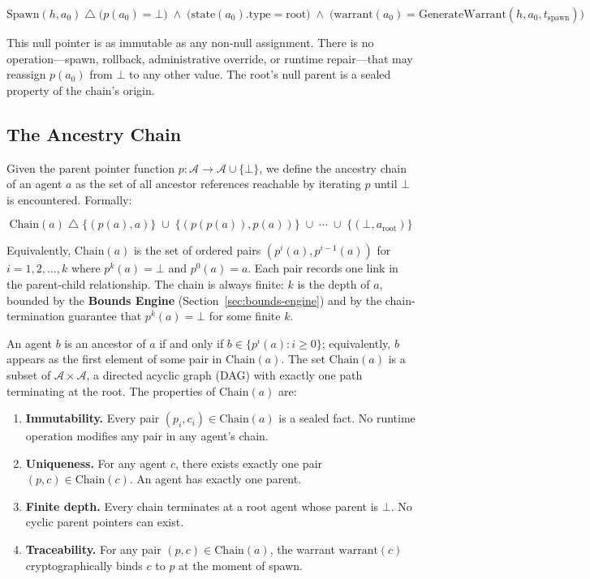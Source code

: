 \begin{equation}
\text{Spawn}(h, a_0) \;\triangle\; \bigl( p(a_0) = \bot \bigr) \;\land\; \bigl( \text{state}(a_0).\text{type} = \text{root} \bigr) \;\land\; \bigl( \text{warrant}(a_0) = \text{GenerateWarrant}(h, a_0, t_{\text{spawn}}) \bigr)
\end{equation}

This null pointer is as immutable as any non-null assignment. There is no operation—spawn, rollback, administrative override, or runtime repair—that may reassign $p(a_0)$ from $\bot$ to any other value. The root's null parent is a sealed property of the chain's origin.

\subsection{The Ancestry Chain}\label{sec:ancestry-chain}

Given the parent pointer function $p : \mathcal{A} \to \mathcal{A} \cup \{\bot\}$, we define the ancestry chain of an agent $a$ as the set of all ancestor references reachable by iterating $p$ until $\bot$ is encountered. Formally:

\begin{equation}
\text{Chain}(a) \;\triangle\; \bigl\{ (p(a), a) \bigr\} \;\cup\; \bigl\{ (p(p(a)), p(a)) \bigr\} \;\cup\; \cdots \;\cup\; \bigl\{ (\bot, a_{\text{root}}) \bigr\}
\label{eq:chain-definition}
\end{equation}

Equivalently, $\text{Chain}(a)$ is the set of ordered pairs $(p^i(a), p^{i-1}(a))$ for $i = 1, 2, \ldots, k$ where $p^k(a) = \bot$ and $p^0(a) = a$. Each pair records one link in the parent-child relationship. The chain is always finite: $k$ is the depth of $a$, bounded by the \textbf{Bounds Engine} (Section~\ref{sec:bounds-engine}) and by the chain-termination guarantee that $p^k(a) = \bot$ for some finite $k$.

An agent $b$ is an ancestor of $a$ if and only if $b \in \{p^i(a) : i \geq 0\}$; equivalently, $b$ appears as the first element of some pair in $\text{Chain}(a)$. The set $\text{Chain}(a)$ is a subset of $\mathcal{A} \times \mathcal{A}$, a directed acyclic graph (DAG) with exactly one path terminating at the root. The properties of $\text{Chain}(a)$ are:

\begin{enumerate}
    \item \textbf{Immutability.} Every pair $(p_i, c_i) \in \text{Chain}(a)$ is a sealed fact. No runtime operation modifies any pair in any agent's chain.
    \item \textbf{Uniqueness.} For any agent $c$, there exists exactly one pair $(p, c) \in \text{Chain}(c)$. An agent has exactly one parent.
    \item \textbf{Finite depth.} Every chain terminates at a root agent whose parent is $\bot$. No cyclic parent pointers can exist.
    \item \textbf{Traceability.} For any pair $(p, c) \in \text{Chain}(a)$, the warrant $\text{warrant}(c)$ cryptographically binds $c$ to $p$ at the moment of spawn.
\end{enumerate}

